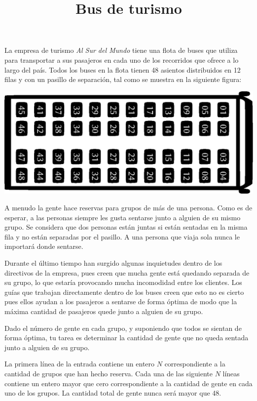 \documentclass{oci}
\title{Bus de turismo}
\begin{document}
\begin{problemDescription}
  La empresa de turismo \emph{Al Sur del Mundo} tiene una flota de buses que
  utiliza para transportar a sus pasajeros en cada uno de los recorridos que
  ofrece a lo largo del país. 
  Todos los buses en la flota tienen 48 asientos distribuidos en 12 filas y con
  un pasillo de separación, tal como se muestra en la siguiente figura:
  \begin{center}
  \includegraphics[scale=0.8]{bus.eps}
  \end{center}
  A menudo la gente hace reservas para grupos de más de una persona.
  Como es de esperar, a las personas siempre les gusta sentarse junto a alguien
  de su mismo grupo.
  Se considera que dos personas están juntas si están sentadas en la misma fila
  y no están separadas por el pasillo.
  A una persona que viaja sola nunca le importará donde sentarse.

  Durante el último tiempo han surgido algunas inquietudes dentro de los
  directivos de la empresa, pues creen que mucha gente está quedando separada de
  su grupo, lo que estaría provocando mucha incomodidad entre los clientes.
  Los guías que trabajan directamente dentro de los buses creen que esto no es
  cierto pues ellos ayudan a los pasajeros a sentarse de forma óptima de modo
  que la máxima cantidad de pasajeros quede junto a alguien de su grupo.

  Dado el número de gente en cada grupo, y suponiendo que todos se sientan de
  forma óptima, tu tarea es determinar la cantidad de gente que no queda sentada
  junto a alguien de su grupo.
  
\end{problemDescription}

\begin{inputDescription}
  La primera línea de la entrada contiene un entero $N$ correspondiente a la
  cantidad de grupos que han hecho reserva.
  Cada una de las siguiente $N$ líneas contiene un entero mayor que cero
  correspondiente a la cantidad de gente en cada uno de los grupos.
  La cantidad total de gente nunca será mayor que 48.
\end{inputDescription}
\end{document}
